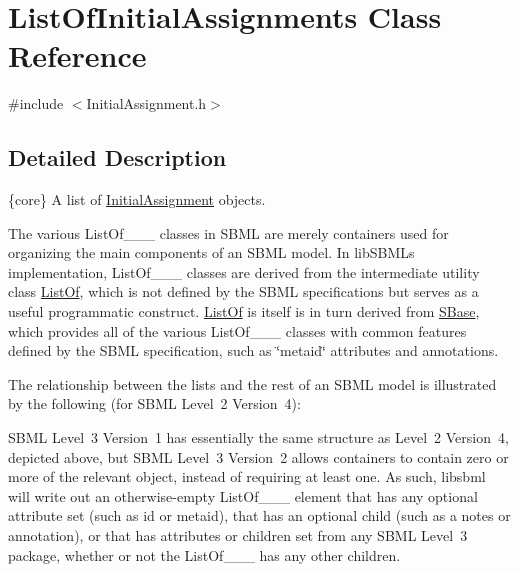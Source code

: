 \hypertarget{class_list_of_initial_assignments}{}\section{List\+Of\+Initial\+Assignments Class Reference}
\label{class_list_of_initial_assignments}


{\ttfamily \#include $<$Initial\+Assignment.\+h$>$}



\subsection{Detailed Description}
\{core\} A list of \hyperlink{class_initial_assignment}{Initial\+Assignment} objects.

\begin{DoxyParagraph}{}
The various List\+Of\+\_\+\+\_\+\+\_\+ classes in S\+B\+ML are merely containers used for organizing the main components of an S\+B\+ML model. In lib\+S\+B\+ML\textquotesingle{}s implementation, List\+Of\+\_\+\+\_\+\+\_\+ classes are derived from the intermediate utility class \hyperlink{class_list_of}{List\+Of}, which is not defined by the S\+B\+ML specifications but serves as a useful programmatic construct. \hyperlink{class_list_of}{List\+Of} is itself is in turn derived from \hyperlink{class_s_base}{S\+Base}, which provides all of the various List\+Of\+\_\+\+\_\+\+\_\+ classes with common features defined by the S\+B\+ML specification, such as \char`\"{}metaid\char`\"{} attributes and annotations.
\end{DoxyParagraph}
The relationship between the lists and the rest of an S\+B\+ML model is illustrated by the following (for S\+B\+ML Level~2 Version~4)\+:



S\+B\+ML Level~3 Version~1 has essentially the same structure as Level~2 Version~4, depicted above, but S\+B\+ML Level~3 Version~2 allows containers to contain zero or more of the relevant object, instead of requiring at least one. As such, libsbml will write out an otherwise-\/empty List\+Of\+\_\+\+\_\+\+\_\+ element that has any optional attribute set (such as \textquotesingle{}id\textquotesingle{} or \textquotesingle{}metaid\textquotesingle{}), that has an optional child (such as a \textquotesingle{}notes\textquotesingle{} or \textquotesingle{}annotation\textquotesingle{}), or that has attributes or children set from any S\+B\+ML Level~3 package, whether or not the List\+Of\+\_\+\+\_\+\+\_\+ has any other children.

